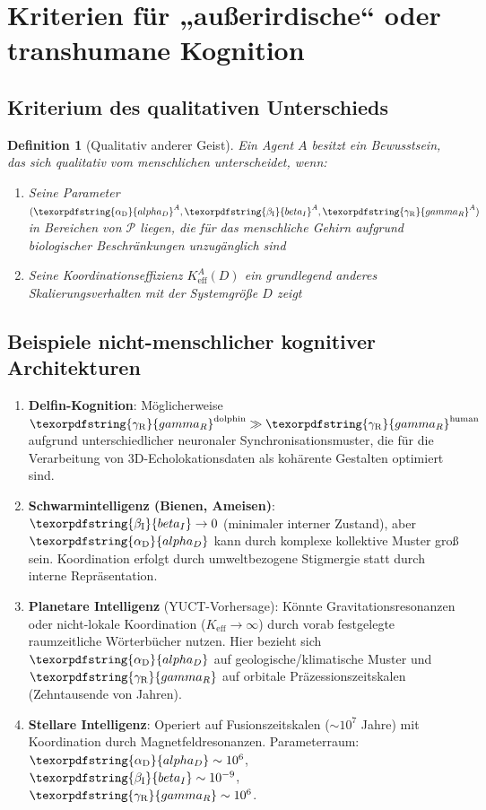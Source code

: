 \documentclass[12pt,a4paper]{article}
\newtheorem{definition}{Definition}
\DeclareRobustCommand{\alD}{\texorpdfstring{\ensuremath{\alpha_{\mathrm{D}}}}{alpha_D}}
\DeclareRobustCommand{\beI}{\texorpdfstring{\ensuremath{\beta_{\mathrm{I}}}}{beta_I}}
\DeclareRobustCommand{\gaR}{\texorpdfstring{\ensuremath{\gamma_{\mathrm{R}}}}{gamma_R}}
\newcommand{\eff}{\mathrm{eff}}
\newcommand{\Ke}{K_{\eff}}
\begin{document}
	\section{Kriterien für „außerirdische`` oder transhumane Kognition}
	
	\subsection{Kriterium des qualitativen Unterschieds}
	
	\begin{definition}[Qualitativ anderer Geist]
		Ein Agent \(A\) besitzt ein Bewusstsein, das sich qualitativ vom menschlichen unterscheidet, wenn:
		\begin{enumerate}
			\item Seine Parameter \((\alD^A, \beI^A, \gaR^A)\) in Bereichen von \(\mathcal{P}\) liegen, die für das menschliche Gehirn aufgrund biologischer Beschränkungen unzugänglich sind
			\item Seine Koordinationseffizienz \(\Ke^A(D)\) ein grundlegend anderes Skalierungsverhalten mit der Systemgröße \(D\) zeigt
		\end{enumerate}
	\end{definition}
	
	\subsection{Beispiele nicht-menschlicher kognitiver Architekturen}
	
	\begin{enumerate}
		\item \textbf{Delfin-Kognition}: Möglicherweise \(\gaR^{\mathrm{dolphin}} \gg \gaR^{\mathrm{human}}\) aufgrund unterschiedlicher neuronaler Synchronisationsmuster, die für die Verarbeitung von 3D-Echolokationsdaten als kohärente Gestalten optimiert sind.
		
		\item \textbf{Schwarmintelligenz (Bienen, Ameisen)}: \(\beI \to 0\) (minimaler interner Zustand), aber \(\alD\) kann durch komplexe kollektive Muster groß sein. Koordination erfolgt durch umweltbezogene Stigmergie statt durch interne Repräsentation.
		
		\item \textbf{Planetare Intelligenz} (YUCT-Vorhersage): Könnte Gravitationsresonanzen oder nicht-lokale Koordination (\(\Ke \to \infty\)) durch vorab festgelegte raumzeitliche Wörterbücher nutzen. Hier bezieht sich \(\alD\) auf geologische/klimatische Muster und \(\gaR\) auf orbitale Präzessionszeitskalen (Zehntausende von Jahren).
		
		\item \textbf{Stellare Intelligenz}: Operiert auf Fusionszeitskalen (\(\sim 10^7\) Jahre) mit Koordination durch Magnetfeldresonanzen. Parameterraum: \(\alD \sim 10^6\), \(\beI \sim 10^{-9}\), \(\gaR \sim 10^6\).
	\end{enumerate}
	
\end{document}
